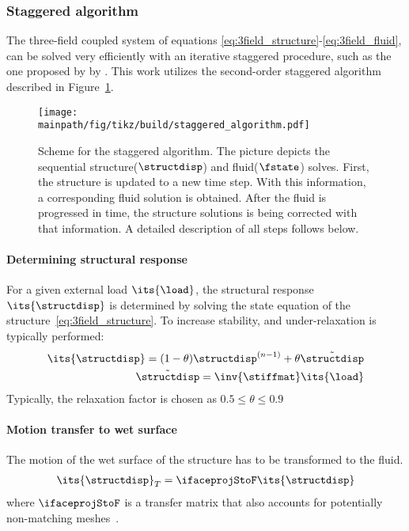 \documentclass[../main.tex]{subfiles}
\begin{document}
\subsubsection{Staggered algorithm}\label{sec:staggered_algorithm}
The three-field coupled system of equations \eqref{eq:3field_structure}-\eqref{eq:3field_fluid}, can be solved very efficiently with an iterative staggered procedure, such as the one proposed by by \cite{Farhat1995}. This work utilizes the second-order staggered algorithm described in Figure~\ref{fig:staggered_algorithm}.


\begin{figure}[h!]
	\begin{center}
        \texttt{[image: \\mainpath/fig/tikz/build/staggered\_algorithm.pdf]}
        \caption[Staggered algorithm scheme]{Scheme for the staggered algorithm. The picture depicts the sequential structure($\structdisp$) and fluid($\fstate$) solves. First, the structure is updated to a new time step. With this information, a corresponding fluid solution is obtained. After the fluid is progressed in time, the structure solutions is being corrected with that information. A detailed description of all steps follows below.}
		\label{fig:staggered_algorithm}
    \end{center}
\end{figure}


\paragraph{\raisebox{.5pt}{\textcircled{\raisebox{-.9pt} {1}}} Determining structural response}
For a given external load $\its{\load}$, the structural response $\its{\structdisp}$ is determined by solving the state equation of the structure~\eqref{eq:3field_structure}. To increase stability, and under-relaxation is typically performed:
\begin{align}
\its{\structdisp}=(1-\theta)\structdisp^{(n-1)}+\theta \tilde{\structdisp} \\
\tilde{\structdisp} = \inv{\stiffmat} \its{\load}
\end{align}
Typically, the relaxation factor is chosen as $0.5\leq\theta\leq 0.9$

\paragraph{\raisebox{.5pt}{\textcircled{\raisebox{-.9pt} {2}}} Motion transfer to wet surface}
The motion of the wet surface of the structure has to be transformed to the fluid.
\begin{align}
\its{\structdisp}_T = \ifaceprojStoF \its{\structdisp}
\end{align}
where $\ifaceprojStoF$ is a transfer matrix that also accounts for potentially non-matching meshes~\cite{Maute2001}.
\end{document}
